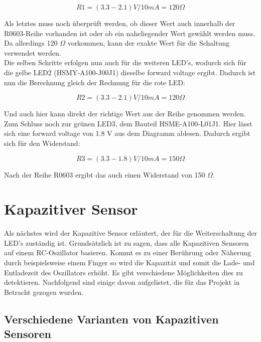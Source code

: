 \documentclass[a4paper,
DIV=13,
12pt,
BCOR=10mm,
department=FakEI,
parskip=half,
automark,
]{article}
\begin{document}
$$ R1 = (3.3 - 2.1)V / 10mA = 120 \Omega$$

Als letztes muss noch überprüft werden, ob dieser Wert auch innerhalb der R0603-Reihe vorhanden ist oder ob ein naheliegender Wert gewählt werden muss. Da allerdings 120 $\Omega$ vorkommen, kann der exakte Wert für die Schaltung verwendet werden. \\

Die selben Schritte erfolgen nun auch für die weiteren LED's, wodurch sich für die gelbe LED2 (HSMY-A100-J00J1) dieselbe forward voltage ergibt. Dadurch ist nun die Berechnung gleich der Rechnung für die rote LED:

$$ R2 = (3.3 - 2.1)V / 10mA = 120 \Omega$$

Und auch hier kann direkt der richtige Wert aus der Reihe genommen werden.\\ 

Zum Schluss noch zur grünen LED3, dem Bauteil HSME-A100-L01J1. Hier lässt sich eine forward voltage von 1.8 V aus dem Diagramm ablesen. 
Dadurch ergibt sich für den Widerstand:

$$ R3 = (3.3 - 1.8)V / 10mA = 150 \Omega$$

Nach der Reihe R0603 ergibt das auch einen Widerstand von 150 $\Omega$.

\newpage
\section{Kapazitiver Sensor}
Als nächstes wird der Kapazitive Sensor erläutert, der für die Weiterschaltung der LED's zuständig ist. Grundsätzlich ist zu sagen, dass alle Kapazitiven Sensoren auf einem RC-Oszillator basieren. Kommt es zu einer Berührung oder Näherung durch beispielsweise einem Finger so wird die Kapazität und somit die Lade- und Entladezeit des Oszillators erhöht. Es gibt verschiedene Möglichkeiten dies zu detektieren. Nachfolgend sind einige davon aufgelistet, die für das Projekt in Betracht gezogen wurden.

\subsection{Verschiedene Varianten von Kapazitiven Sensoren}
\label{VerschiedeneKapSenVar}
\end{document}

